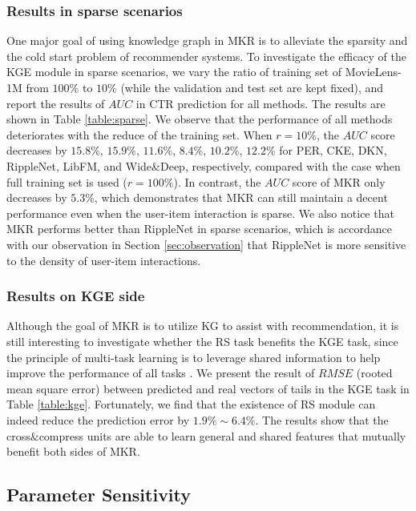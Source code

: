 \documentclass[sigconf]{acmart}
\begin{document}
		
		\subsubsection{Results in sparse scenarios}
		\label{sec:sparse}
			One major goal of using knowledge graph in MKR is to alleviate the sparsity and the cold start problem of recommender systems.
			To investigate the efficacy of the KGE module in sparse scenarios, we vary the ratio of training set of MovieLens-1M from $100\%$ to $10\%$ (while the validation and test set are kept fixed), and report the results of $AUC$ in CTR prediction for all methods.
			The results are shown in Table \ref{table:sparse}.
			We observe that the performance of all methods deteriorates with the reduce of the training set.
			When $r=10\%$, the $AUC$ score decreases by $15.8\%$, $15.9\%$, $11.6\%$, $8.4\%$, $10.2\%$, $12.2\%$ for PER, CKE, DKN, RippleNet, LibFM, and Wide$\&$Deep, respectively, compared with the case when full training set is used ($r=100\%$).
			In contrast, the $AUC$ score of MKR only decreases by $5.3\%$, which demonstrates that MKR can still maintain a decent performance even when the user-item interaction is sparse.
			We also notice that MKR performs better than RippleNet in sparse scenarios, which is accordance with our observation in Section \ref{sec:observation} that RippleNet is more sensitive to the density of user-item interactions.			
       		
        
		
        \subsubsection{Results on KGE side}
        	Although the goal of MKR is to utilize KG to assist with recommendation, it is still interesting to investigate whether the RS task benefits the KGE task, since the principle of multi-task learning is to leverage shared information to help improve the performance of all tasks \cite{zhang2017survey}.
        	We present the result of $RMSE$ (rooted mean square error) between predicted and real vectors of tails in the KGE task in Table \ref{table:kge}.
        	Fortunately, we find that the existence of RS module can indeed reduce the prediction error by $1.9\% \sim 6.4\%$.
       		The results show that the cross$\&$compress units are able to learn general and shared features that mutually benefit both sides of MKR.
       		        
        
        
	\subsection{Parameter Sensitivity}             
\end{document}
